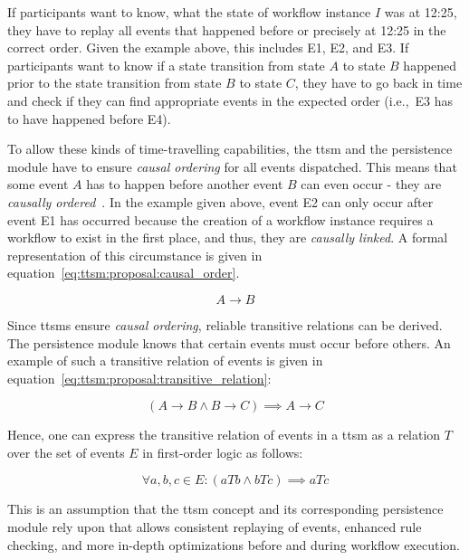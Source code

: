 If participants want to know, what the state of workflow instance $I$ was at 12:25, they have to replay all events that happened before or precisely at 12:25 in the correct order. Given the example above, this includes E1, E2, and E3. If participants want to know if a state transition from state $A$ to state $B$ happened prior to the state transition from state $B$ to state $C$, they have to go back in time and check if they can find appropriate events in the expected order (i.e.,\ E3 has to have happened before E4).

To allow these kinds of time-travelling capabilities, the \gls{ttsm} and the persistence module have to ensure \textit{causal ordering} for all events dispatched. This means that some event $A$ has to happen before another event $B$ can even occur - they are \textit{causally ordered}~\cite{causal_ordering}. In the example given above, event E2 can only occur after event E1 has occurred because the creation of a workflow instance requires a workflow to exist in the first place, and thus, they are \textit{causally linked}. A formal representation of this circumstance is given in equation~\ref{eq:ttsm:proposal:causal_order}.

\begin{equation}
\label{eq:ttsm:proposal:causal_order}
A \longrightarrow B
\end{equation}

Since \glspl{ttsm} ensure \textit{causal ordering}, reliable transitive relations can be derived. The persistence module knows that certain events must occur before others. An example of such a transitive relation of events is given in equation~\ref{eq:ttsm:proposal:transitive_relation}:

\begin{equation}
\label{eq:ttsm:proposal:transitive_relation}
(A \longrightarrow B \wedge B \longrightarrow C) \implies A \longrightarrow C
\end{equation}

Hence, one can express the transitive relation of events in a \gls{ttsm} as a relation $T$ over the set of events $E$ in first-order logic as follows:

\begin{equation}
\label{eq:ttsm:proposal:transitive_relation_over_ttsm_events}
\forall a, b, c \in E : (aTb \wedge bTc) \implies aTc
\end{equation}

This is an assumption that the \gls{ttsm} concept and its corresponding persistence module rely upon that allows consistent replaying of events, enhanced rule checking, and more in-depth optimizations before and during workflow execution.


